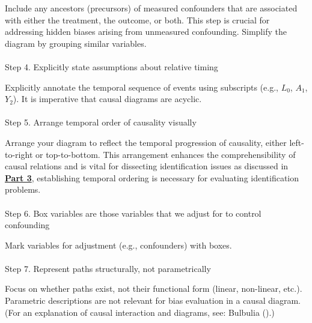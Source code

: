 \documentclass[
  single column]{article}
\makeatletter
\let\oldparagraph\paragraph
\renewcommand{\paragraph}{
    \@ifstar
      \xxxParagraphStar
      \xxxParagraphNoStar
  }
\newcommand{\xxxParagraphStar}[1]{\oldparagraph*{#1}\mbox{}}
\newcommand{\xxxParagraphNoStar}[1]{\oldparagraph{#1}\mbox{}}
\makeatother
\begin{document}
Include any ancestors (precursors) of measured confounders that are
associated with either the treatment, the outcome, or both. This step is
crucial for addressing hidden biases arising from unmeasured
confounding. Simplify the diagram by grouping similar variables.

\paragraph{Step 4. Explicitly state assumptions about relative
timing}\label{step-4.-explicitly-state-assumptions-about-relative-timing}

Explicitly annotate the temporal sequence of events using subscripts
(e.g., \(L_0\), \(A_1\), \(Y_2\)). It is imperative that causal diagrams
are acyclic.

\paragraph{Step 5. Arrange temporal order of causality
visually}\label{step-5.-arrange-temporal-order-of-causality-visually}

Arrange your diagram to reflect the temporal progression of causality,
either left-to-right or top-to-bottom. This arrangement enhances the
comprehensibility of causal relations and is vital for dissecting
identification issues as discussed in \hyperref[sec-part3]{\textbf{Part
3}}, establishing temporal ordering is necessary for evaluating
identification problems.

\paragraph{Step 6. Box variables are those variables that we adjust for
to control
confounding}\label{step-6.-box-variables-are-those-variables-that-we-adjust-for-to-control-confounding}

Mark variables for adjustment (e.g., confounders) with boxes.

\paragraph{Step 7. Represent paths structurally, not
parametrically}\label{step-7.-represent-paths-structurally-not-parametrically}

Focus on whether paths exist, not their functional form (linear,
non-linear, etc.). Parametric descriptions are not relevant for bias
evaluation in a causal diagram. (For an explanation of causal
interaction and diagrams, see: Bulbulia
().)
\end{document}
